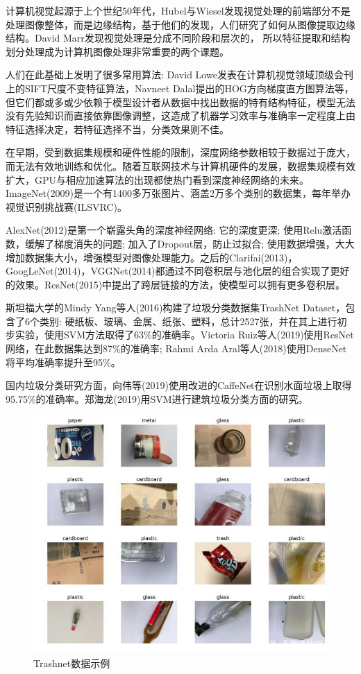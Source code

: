 \documentclass[a4paper]{article}
\begin{document}
\begin{CJK*}{UTF8}{gbsn}
计算机视觉起源于上个世纪50年代，Hubel与Wiesel\cite{hubel1962receptive}发现视觉处理的前端部分不是处理图像整体，而是边缘结构，基于他们的发现，人们研究了如何从图像提取边缘结构。David Marr\cite{marr1980theory}发现视觉处理是分成不同阶段和层次的，
所以特征提取和结构划分处理成为计算机图像处理非常重要的两个课题。

人们在此基础上发明了很多常用算法: David Lowe发表在计算机视觉领域顶级会刊上的SIFT尺度不变特征算法\cite{790410}，Navneet Dalal提出的HOG方向梯度直方图算法\cite{dalal2005histograms}等，但它们都或多或少依赖于模型设计者从数据中找出数据的特有结构特征，模型无法没有先验知识而直接依靠图像调整，这造成了机器学习效率与准确率一定程度上由特征选择决定，若特征选择不当，分类效果则不佳。


在早期，受到数据集规模和硬件性能的限制，深度网络参数相较于数据过于庞大，而无法有效地训练和优化。随着互联网技术与计算机硬件的发展，数据集规模有效扩大，GPU与相应加速算法的出现都使热门看到深度神经网络的未来。ImageNet(2009)是一个有1400多万张图片、涵盖2万多个类别的数据集，每年举办视觉识别挑战赛(ILSVRC)。

AlexNet(2012)是第一个崭露头角的深度神经网络: 它的深度更深; 使用Relu激活函数，缓解了梯度消失的问题; 加入了Dropout层，防止过拟合; 使用数据增强，大大增加数据集大小，增强模型对图像处理能力。之后的Clarifai(2013)，GoogLeNet(2014)，VGGNet(2014)都通过不同卷积层与池化层的组合实现了更好的效果。ResNet(2015)中提出了跨层链接的方法，使模型可以拥有更多卷积层。


斯坦福大学的Mindy Yang等人(2016)构建了垃圾分类数据集TrashNet Dataset，包含了6个类别: 硬纸板、玻璃、金属、纸张、塑料，总计2527张，并在其上进行初步实验，使用SVM方法\cite{yang2016classification}取得了63\%的准确率。Victoria Ruiz等人(2019)使用ResNet网络，在此数据集达到87\%的准确率; Rahmi Arda Aral等人(2018)使用DenseNet将平均准确率提升至95\%。

国内垃圾分类研究方面，向伟等(2019)使用改进的CaffeNet在识别水面垃圾上取得95.75\%的准确率。郑海龙(2019)用SVM进行建筑垃圾分类方面的研究。

\begin{figure}[h!]
\centering
\includegraphics[scale=0.3]{trashnet_example.jpeg}
\caption{Trashnet数据示例}
\label{fig:trashnet_example}
\end{figure}


\end{CJK*}
\end{document}
